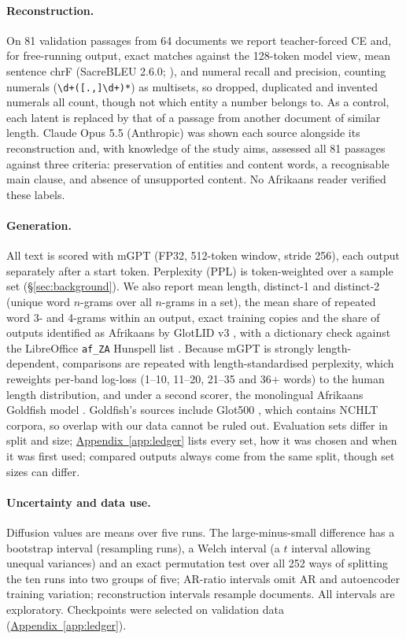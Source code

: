 \documentclass[11pt,a4paper]{article}
\begin{document}
\paragraph{Reconstruction.} On 81 validation passages from 64 documents we report teacher-forced CE and, for free-running output, exact matches against the 128-token model view, mean sentence chrF \citep{popovic2015chrf} (SacreBLEU 2.6.0; \citealp{post2018call}), and numeral recall and precision, counting numerals (\verb|\d+([.,]\d+)*|) as multisets, so dropped, duplicated and invented numerals all count, though not which entity a number belongs to. As a control, each latent is replaced by that of a passage from another document of similar length. Claude Opus 5.5 (Anthropic) was shown each source alongside its reconstruction and, with knowledge of the study aims, assessed all 81 passages against three criteria: preservation of entities and content words, a recognisable main clause, and absence of unsupported content. No Afrikaans reader verified these labels.

\paragraph{Generation.} All text is scored with mGPT (FP32, 512-token window, stride 256), each output separately after a start token. Perplexity (PPL) is token-weighted over a sample set (\S\ref{sec:background}). We also report mean length, distinct-1 and distinct-2 (unique word $n$-grams over all $n$-grams in a set), the mean share of repeated word 3- and 4-grams within an output, exact training copies and the share of outputs identified as Afrikaans by GlotLID v3 \citep{kargaran2023glotlid}, with a dictionary check against the LibreOffice \texttt{af\_ZA} Hunspell list \citep{libreoffice2026afza}. Because mGPT is strongly length-dependent, comparisons are repeated with length-standardised perplexity, which reweights per-band log-loss (1--10, 11--20, 21--35 and 36+ words) to the human length distribution, and under a second scorer, the monolingual Afrikaans Goldfish model \citep{chang2024goldfish}. Goldfish's sources include Glot500 \citep{imani2023glot500}, which contains NCHLT corpora, so overlap with our data cannot be ruled out. Evaluation sets differ in split and size; \hyperref[app:ledger]{Appendix~\ref*{app:ledger}} lists every set, how it was chosen and when it was first used; compared outputs always come from the same split, though set sizes can differ.

\paragraph{Uncertainty and data use.} Diffusion values are means over five runs. The large-minus-small difference has a bootstrap interval (resampling runs), a Welch interval (a $t$ interval allowing unequal variances) and an exact permutation test over all 252 ways of splitting the ten runs into two groups of five; AR-ratio intervals omit AR and autoencoder training variation; reconstruction intervals resample documents. All intervals are exploratory. Checkpoints were selected on validation data (\hyperref[app:ledger]{Appendix~\ref*{app:ledger}}).
\end{document}
